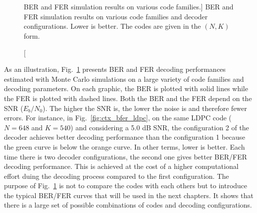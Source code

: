 \begin{figure}[htp]
  \centering
     \quad{}
    \\
    \quad{}
      \\
   \quad{}
  \caption
    [BER and FER simulation results on various code families.]
    {BER and FER simulation results on various code families and decoder
    configurations. Lower is better. The codes are given in the $(N,K)$ form.}
  \label{fig:ctx_bfer}
\end{figure}

As an illustration, Fig.~\ref{fig:ctx_bfer} presents BER and FER decoding
performances estimated with Monte Carlo simulations on a large variety of code
families and decoding parameters. On each graphic, the BER is plotted with solid
lines while the FER is plotted with dashed lines. Both the BER and the FER
depend on the SNR ($E_b/N_0$). The higher the SNR is, the lower the noise is and
therefore fewer errors. For instance, in Fig.~\ref{fig:ctx_bfer_ldpc}, on
the same LDPC code ($N = 648$ and $K = 540$) and considering a 5.0 dB SNR, the
configuration 2 of the decoder achieves better decoding performance than the
configuration 1 because the {\color{Paired-3} green} curve is below the
{\color{Paired-7} orange} curve. In other terms, lower is better. Each time
there is two decoder configurations, the second one gives better BER/FER
decoding performance. This is achieved at the cost of a higher computational
effort duing the decoding process compared to the first configuration. The
purpose of Fig.~\ref{fig:ctx_bfer} is not to compare the codes with each
others but to introduce the typical BER/FER curves that will be used in the next
chapters. It shows that there is a large set of possible combinations of codes
and decoding configurations.

